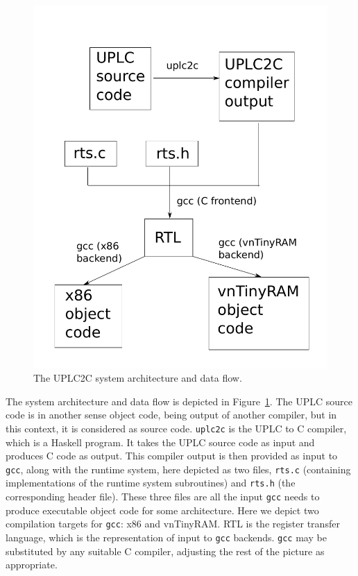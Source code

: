 \documentclass[12pt]{article}
\begin{document}
\begin{figure}
	\includegraphics[width=1.0\columnwidth]{system-and-process-diagram.pdf}
	\caption{The UPLC2C system architecture and data flow.}
	\label{fig:system}
\end{figure}

The system architecture and data flow is depicted in Figure~\ref{fig:system}. The UPLC source code is in another sense object code, being output of another compiler, but in this context, it is considered as source code. \texttt{uplc2c} is the UPLC to C compiler, which is a Haskell program. It takes the UPLC source code as input and produces C code as output. This compiler output is then provided as input to \texttt{gcc}, along with the runtime system, here depicted as two files, \texttt{rts.c} (containing implementations of the runtime system subroutines) and \texttt{rts.h} (the corresponding header file). These three files are all the input \texttt{gcc} needs to produce executable object code for some architecture. Here we depict two compilation targets for \texttt{gcc}: x86 and vnTinyRAM. RTL is the register transfer language, which is the representation of input to \texttt{gcc} backends. \cite{rtl} \texttt{gcc} may be substituted by any suitable C compiler, adjusting the rest of the picture as appropriate.
\end{document}
